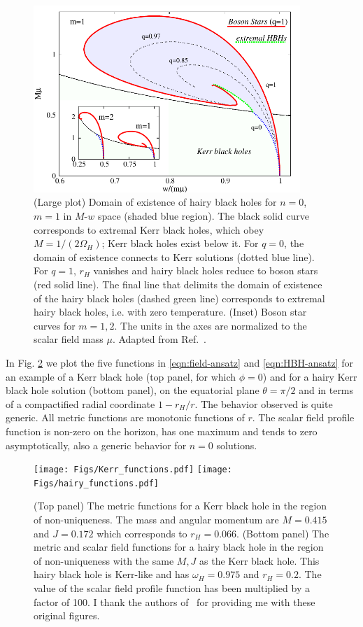 \begin{figure}[H]
  \begin{center}
  \includegraphics[height=2.78in]{Figs/BH-w-M.pdf}
  \end{center}
  \caption{(Large plot) Domain of existence of hairy black holes for $n=0$, $m=1$ in $M$-$w$ space (shaded blue region). The black solid curve corresponds to extremal Kerr black holes, which obey $M={1}/(2\Omega_H)$; Kerr black holes exist below it. For $q=0$, the domain of existence connects to Kerr solutions (dotted blue line). For $q=1$, $r_H$ vanishes and hairy black holes reduce to boson stars (red solid line). The final line that delimits the domain of existence of the hairy black holes (dashed green line) corresponds to extremal hairy black holes, i.e. with zero temperature. (Inset) Boson star curves for $m=1,2$. The units in the axes are normalized to the scalar field mass $\mu$. Adapted from Ref.~\cite{Herdeiro:2014goa}.}
  \label{fig:HBH-parameter-space}
\end{figure}

In Fig. \ref{functions_plot} we plot the five functions in \eqref{eqn:field-ansatz} and \eqref{eqn:HBH-ansatz} for an example of a Kerr black hole (top panel, for which $\phi=0$) and for a hairy Kerr black hole solution (bottom panel), on the equatorial plane $\theta=\pi/2$ and in terms of a compactified radial coordinate $1-r_H/r$.
The behavior observed is quite generic.
All metric functions are monotonic functions of $r$.
The scalar field profile function is non-zero on the horizon, has one maximum and tends to zero asymptotically, also a generic behavior for $n=0$ solutions. 

\begin{figure}[H]
\centering
\texttt{[image: Figs/Kerr\_functions.pdf]}
\texttt{[image: Figs/hairy\_functions.pdf]}\\
\caption{(Top panel) The metric functions for a Kerr black hole in the region of non-uniqueness. The mass and angular momentum are $M=0.415$ and $J=0.172$ which corresponds to $r_H= 0.066$. (Bottom panel) The metric and scalar field functions for a hairy black hole in the region of non-uniqueness with the same $M,J$ as the Kerr black hole. This hairy black hole is Kerr-like and has $\omega_H=0.975$ and $r_H=0.2$. The value of the scalar field profile function has been multiplied by a factor of 100. I thank the authors of~\cite{Herdeiro:2014goa} for providing me with these original figures.} 
\label{functions_plot}
\end{figure}

